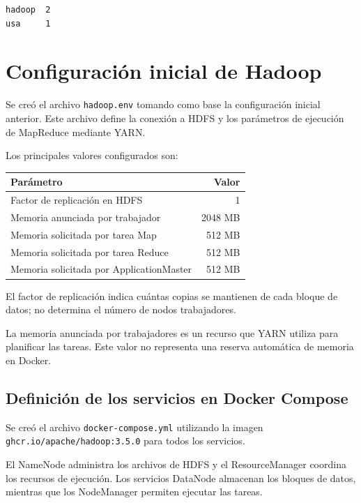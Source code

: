 \begin{lstlisting}[language={}]
hadoop  2
usa     1
\end{lstlisting}

\section{Configuración inicial de Hadoop}

Se creó el archivo \texttt{hadoop.env} tomando como base la configuración inicial anterior. 
Este archivo define la conexión a HDFS y los parámetros de ejecución de MapReduce mediante YARN.

Los principales valores configurados son:

\begin{center}
    \begin{tabular}{lr}
        \toprule
        \textbf{Parámetro} & \textbf{Valor} \\
        \midrule
        Factor de replicación en HDFS & 1 \\
        Memoria anunciada por trabajador & 2048 MB \\
        Memoria solicitada por tarea Map & 512 MB \\
        Memoria solicitada por tarea Reduce & 512 MB \\
        Memoria solicitada por ApplicationMaster & 512 MB \\
        \bottomrule
    \end{tabular}
\end{center}

El factor de replicación indica cuántas copias se mantienen
de cada bloque de datos; no determina el número de nodos
trabajadores.

La memoria anunciada por trabajadores es un recurso que YARN 
utiliza para planificar las tareas. Este valor no representa 
una reserva automática de memoria en Docker.

\subsection{Definición de los servicios en Docker Compose}

Se creó el archivo \texttt{docker-compose.yml} utilizando 
la imagen \texttt{ghcr.io/apache/hadoop:3.5.0} para todos los servicios.

El NameNode administra los archivos de HDFS y el 
ResourceManager coordina los recursos de ejecución. 
Los servicios DataNode almacenan los bloques de datos, 
mientras que los NodeManager permiten ejecutar las tareas.

